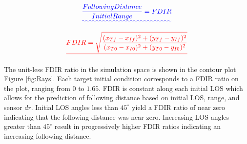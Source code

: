 \documentclass[conference]{IEEEtran}
\providecommand{\DIFadd}[1]{{\protect\color{blue}\uwave{#1}}} %
\providecommand{\DIFdel}[1]{{\protect\color{red}\sout{#1}}}                      %
\providecommand{\DIFaddbegin}{} %
\providecommand{\DIFaddend}{} %
\providecommand{\DIFdelbegin}{} %
\providecommand{\DIFdelend}{} %
\newcommand{\DIFscaledelfig}{0.5}
\newlength{\DIFdelgraphicswidth} %
\newlength{\DIFdelgraphicsheight} %
\newcommand{\DIFaddincludegraphics}[2][]{{\color{blue}\fbox{\DIFOincludegraphics[#1]{#2}}}} %
\newcommand{\DIFdelincludegraphics}[2][]{%
\sbox{\DIFdelgraphicsbox}{\DIFOincludegraphics[#1]{#2}}%
\settoboxwidth{\DIFdelgraphicswidth}{\DIFdelgraphicsbox} %
\settoboxtotalheight{\DIFdelgraphicsheight}{\DIFdelgraphicsbox} %
\scalebox{\DIFscaledelfig}{%
\parbox[b]{\DIFdelgraphicswidth}{\usebox{\DIFdelgraphicsbox}\\[-\baselineskip] \rule{\DIFdelgraphicswidth}{0em}}\llap{\resizebox{\DIFdelgraphicswidth}{\DIFdelgraphicsheight}{%
\setlength{\unitlength}{\DIFdelgraphicswidth}%
\begin{picture}(1,1)%
\thicklines\linethickness{2pt} %
{\color[rgb]{1,0,0}\put(0,0){\framebox(1,1){}}}%
{\color[rgb]{1,0,0}\put(0,0){\line( 1,1){1}}}%
{\color[rgb]{1,0,0}\put(0,1){\line(1,-1){1}}}%
\end{picture}%
}\hspace*{3pt}}} %
} %
\DeclareRobustCommand{\DIFaddbegin}{\DIFOaddbegin \let\includegraphics\DIFaddincludegraphics} %
\DeclareRobustCommand{\DIFaddend}{\DIFOaddend \let\includegraphics\DIFOincludegraphics} %
\DeclareRobustCommand{\DIFdelbegin}{\DIFOdelbegin \let\includegraphics\DIFdelincludegraphics} %
\DeclareRobustCommand{\DIFdelend}{\DIFOaddend \let\includegraphics\DIFOincludegraphics} %
\begin{document}

\DIFaddbegin \begin{equation} 
\DIFadd{\label{eq:FDIR}
\frac{Following Distance}{Initial Range} = FDIR
}\end{equation}
\DIFaddend 

\DIFdelbegin \begin{displaymath} 
\DIFdel{%
FDIR = \sqrt{\frac{(x_{Tf}-x_{If})^2+(y_{Tf}-y_{If})^2}{(x_{T0}-x_{I0})^2+(y_{T0}-y_{I0})^2}}
}\end{displaymath}

\DIFdelend The unit-less FDIR ratio in the simulation space is shown in the contour plot Figure \ref{fig:Rays}. Each target initial condition corresponds to a FDIR ratio on the plot, ranging from $0$ to $1.65$. FDIR is constant along each initial LOS which allows for the prediction of following distance based on initial LOS, range, and sensor $dr$. Initial LOS angles less than $45^{\circ}$ yield a FDIR ratio of near zero indicating that the following distance was near zero. Increasing LOS angles greater than $45^{\circ}$ result in progressively higher FDIR ratios indicating an increasing following distance.
\end{document}
